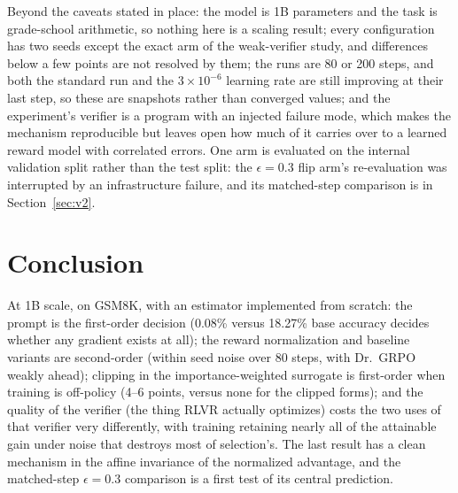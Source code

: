 \documentclass{article}
\begin{document}
Beyond the caveats stated in place: the model is 1B parameters and the task is grade-school arithmetic, so nothing here is a scaling result; every configuration has two seeds except the exact arm of the weak-verifier study, and differences below a few points are not resolved by them; the runs are 80 or 200 steps, and both the standard run and the $3\times10^{-6}$ learning rate are still improving at their last step, so these are snapshots rather than converged values; and the experiment's verifier is a program with an injected failure mode, which makes the mechanism reproducible but leaves open how much of it carries over to a learned reward model with correlated errors. One arm is evaluated on the internal validation split rather than the test split: the $\epsilon=0.3$ flip arm's re-evaluation was interrupted by an infrastructure failure, and its matched-step comparison is in Section~\ref{sec:v2}.

\section{Conclusion}
\label{sec:conclusion}

At 1B scale, on GSM8K, with an estimator implemented from scratch: the prompt is the first-order decision (0.08\% versus 18.27\% base accuracy decides whether any gradient exists at all); the reward normalization and baseline variants are second-order (within seed noise over 80 steps, with Dr.~GRPO weakly ahead); clipping in the importance-weighted surrogate is first-order when training is off-policy (4--6 points, versus none for the clipped forms); and the quality of the verifier (the thing RLVR actually optimizes) costs the two uses of that verifier very differently, with training retaining nearly all of the attainable gain under noise that destroys most of selection's. The last result has a clean mechanism in the affine invariance of the normalized advantage, and the matched-step $\epsilon=0.3$ comparison is a first test of its central prediction.
\end{document}
